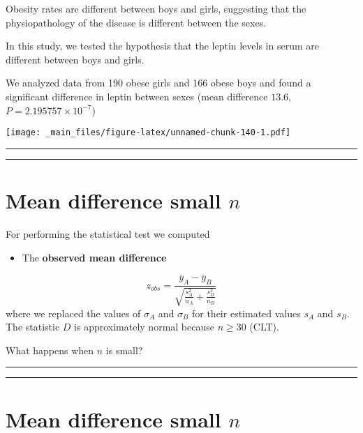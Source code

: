 \documentclass[
]{book}
\providecommand{\tightlist}{%
  \setlength{\itemsep}{0pt}\setlength{\parskip}{0pt}}
\begin{document}
Obesity rates are different between boys and girls, suggesting that the physiopathology of the disease is different between the sexes.

In this study, we tested the hypothesis that the leptin levels in serum are different between boys and girls.

We analyzed data from 190 obese girls and 166 obese boys and found a significant difference in leptin between sexes (mean difference \(13.6\), \(P=2.195757 \times 10^{-7}\))

\texttt{[image: \_main\_files/figure-latex/unnamed-chunk-140-1.pdf]}

\begin{center}\rule{0.5\linewidth}{0.5pt}\end{center}

\begin{center}\rule{0.5\linewidth}{0.5pt}\end{center}

\hypertarget{mean-difference-small-n}{%
\section{\texorpdfstring{Mean difference small \(n\)}{Mean difference small n}}\label{mean-difference-small-n}}

For performing the statistical test we computed

\begin{itemize}
\tightlist
\item
  The \textbf{observed mean difference}
\end{itemize}

\[z_{obs}=\frac{\bar{y}_A-\bar{y}_B }{\sqrt{\frac{s^2_A}{n_A}+\frac{s^2_B}{n_B}}}\]
where we replaced the values of \(\sigma_A\) and \(\sigma_B\) for their estimated values \(s_A\) and \(s_B\). The statistic \(D\) is approximately normal because \(n\ge 30\) (CLT).

What happens when \(n\) is small?

\begin{center}\rule{0.5\linewidth}{0.5pt}\end{center}

\begin{center}\rule{0.5\linewidth}{0.5pt}\end{center}

\hypertarget{mean-difference-small-n-1}{%
\section{\texorpdfstring{Mean difference small \(n\)}{Mean difference small n}}\label{mean-difference-small-n-1}}
\end{document}
